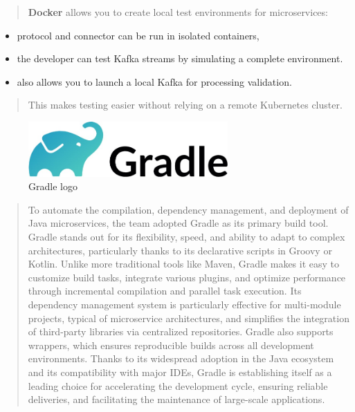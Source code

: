 \documentclass[12pt,a4paper]{report}
\begin{document}
\begin{quote}
\textbf{Docker} allows you to create local test environments for
microservices:
\end{quote}

\begin{itemize}
\item
  protocol and connector can be run in isolated containers,
\item
  the developer can test Kafka streams by simulating a complete
  environment.
\item
  also allows you to launch a local Kafka for processing validation.
\end{itemize}

\begin{quote}
This makes testing easier without relying on a remote Kubernetes
cluster.
\end{quote}

\begin{figure}[H]
\centering
\includegraphics[width=3in]{media/image91.jpeg}
\caption{Gradle logo}
\label{fig:gradle-logo}
\end{figure}


\begin{quote}
To automate the compilation, dependency management, and deployment of
Java microservices, the team adopted Gradle as its primary build tool.
Gradle stands out for its flexibility, speed, and ability to adapt to
complex architectures, particularly thanks to its declarative scripts in
Groovy or Kotlin. Unlike more traditional tools like Maven, Gradle makes
it easy to customize build tasks, integrate various plugins, and
optimize performance through incremental compilation and parallel task
execution. Its dependency management system is particularly effective
for multi-module projects, typical of microservice architectures, and
simplifies the integration of third-party libraries via centralized
repositories. Gradle also supports wrappers, which ensures reproducible
builds across all development environments. Thanks to its widespread
adoption in the Java ecosystem and its compatibility with major IDEs,
Gradle is establishing itself as a leading choice for accelerating the
development cycle, ensuring reliable deliveries, and facilitating the
maintenance of large-scale applications.
\end{quote}
\end{document}
